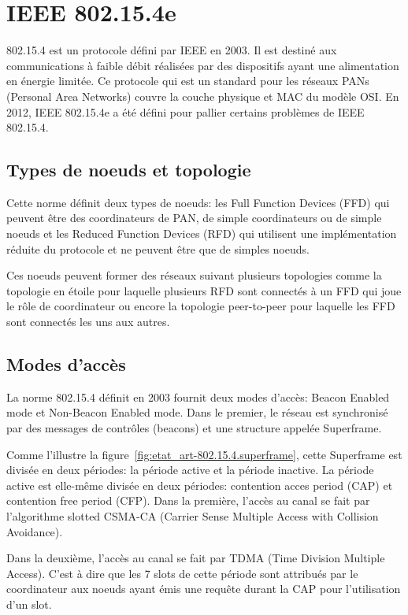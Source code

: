 \section{IEEE 802.15.4e}\label{sec:etat_art-802.15.4}
\renewcommand{\rightmark}{IEEE 802.15.4e}
    802.15.4 est un protocole défini par IEEE en 2003. Il est destiné aux communications à faible débit réalisées par des dispositifs ayant une alimentation en énergie limitée.
    Ce protocole qui est un standard pour les réseaux PANs (Personal Area Networks) couvre la couche physique et MAC du modèle OSI. En 2012, IEEE 802.15.4e a été défini pour pallier certains problèmes de IEEE 802.15.4.

  \subsection*{Types de noeuds et topologie}
    Cette norme définit deux types de noeuds: les Full Function Devices (FFD) qui peuvent être des coordinateurs de PAN, de simple coordinateurs ou de simple noeuds et les Reduced Function Devices (RFD) qui utilisent une implémentation réduite du protocole et ne peuvent être que de simples noeuds.

    Ces noeuds peuvent former des réseaux suivant plusieurs topologies
    comme la topologie en étoile pour laquelle plusieurs RFD sont connectés à un FFD qui
    joue le rôle de coordinateur ou encore la topologie peer-to-peer pour laquelle les FFD sont connectés les uns aux autres.

  \subsection*{Modes d'accès}
    La norme 802.15.4 définit en 2003 fournit deux modes d'accès: Beacon Enabled mode et Non-Beacon Enabled mode.
    Dans le premier, le réseau est synchronisé par des messages de contrôles (beacons)
    et une structure appelée Superframe.

    Comme l'illustre la figure~\ref{fig:etat_art-802.15.4.superframe}, cette Superframe est divisée en deux périodes: la période active et la période inactive. La période active est elle-même divisée en deux périodes: contention acces period (CAP) et contention free period (CFP). Dans la première, l'accès au canal se fait par l'algorithme slotted CSMA-CA (Carrier Sense Multiple Access with Collision Avoidance).
    
    Dans la deuxième, l'accès au canal se fait par TDMA (Time Division Multiple Access). C'est à dire que les 7 slots de cette période sont attribués par le coordinateur aux noeuds ayant émis une requête durant la CAP pour l'utilisation d'un slot.

